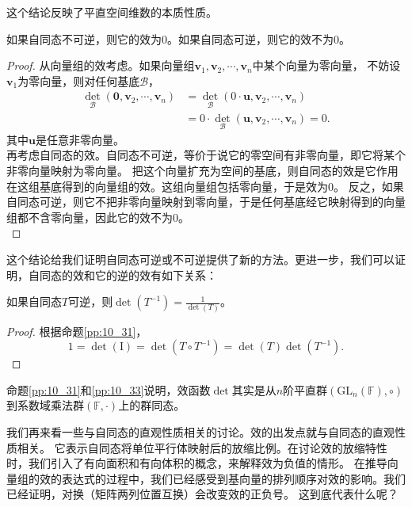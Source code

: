 \documentclass[12pt,UTF8]{ctexbook}
\begin{document}
这个结论反映了平直空间维数的本质性质。

\begin{pp}\label{pp:10_32}
    如果自同态不可逆，则它的效为$0$。如果自同态可逆，则它的效不为$0$。
\end{pp}
\begin{proof} %
    从向量组的效考虑。如果向量组$\mathbf{v}_1, \mathbf{v}_2, \cdots, \mathbf{v}_n$中某个向量为零向量，
    不妨设$\mathbf{v}_1$为零向量，则对任何基底$\mathcal{B}$，
    \begin{align*}
        \det_\mathcal{B} (\mathbf{0}, \mathbf{v}_2, \cdots, \mathbf{v}_n) &= \det_\mathcal{B} (0\cdot \mathbf{u}, \mathbf{v}_2, \cdots, \mathbf{v}_n)  \\
        &= 0\cdot \det_\mathcal{B} (\mathbf{u}, \mathbf{v}_2, \cdots, \mathbf{v}_n) = 0.  
    \end{align*}
    其中$\mathbf{u}$是任意非零向量。\\
    再考虑自同态的效。自同态不可逆，等价于说它的零空间有非零向量，即它将某个非零向量映射为零向量。
    把这个向量扩充为空间的基底，则自同态的效是它作用在这组基底得到的向量组的效。这组向量组包括零向量，于是效为$0$。
    反之，如果自同态可逆，则它不把非零向量映射到零向量，于是任何基底经它映射得到的向量组都不含零向量，因此它的效不为$0$。\\
\end{proof}

这个结论给我们证明自同态可逆或不可逆提供了新的方法。更进一步，我们可以证明，自同态的效和它的逆的效有如下关系：
\begin{pp}\label{pp:10_33}
    如果自同态$T$可逆，则$\det(T^{-1}) = \frac{1}{\det(T)}$。
\end{pp}
\begin{proof} %
    根据命题\ref{pp:10_31}，
    $$1 = \det(\mathrm{I}) = \det(T\circ T^{-1}) = \det(T) \det(T^{-1}).$$
\end{proof}

命题\ref{pp:10_31}和\ref{pp:10_33}说明，效函数$\det$其实是从$n$阶平直群$(\mathrm{GL}_n(\mathbb{F}), \circ)$到系数域乘法群$(\mathbb{F}, \cdot)$上的群同态。

我们再来看一些与自同态的直观性质相关的讨论。效的出发点就与自同态的直观性质相关。
它表示自同态将单位平行体映射后的放缩比例。在讨论效的放缩特性时，我们引入了有向面积和有向体积的概念，来解释效为负值的情形。
在推导向量组的效的表达式的过程中，我们已经感受到基向量的排列顺序对效的影响。我们已经证明，对换（矩阵两列位置互换）会改变效的正负号。
这到底代表什么呢？
\end{document}
